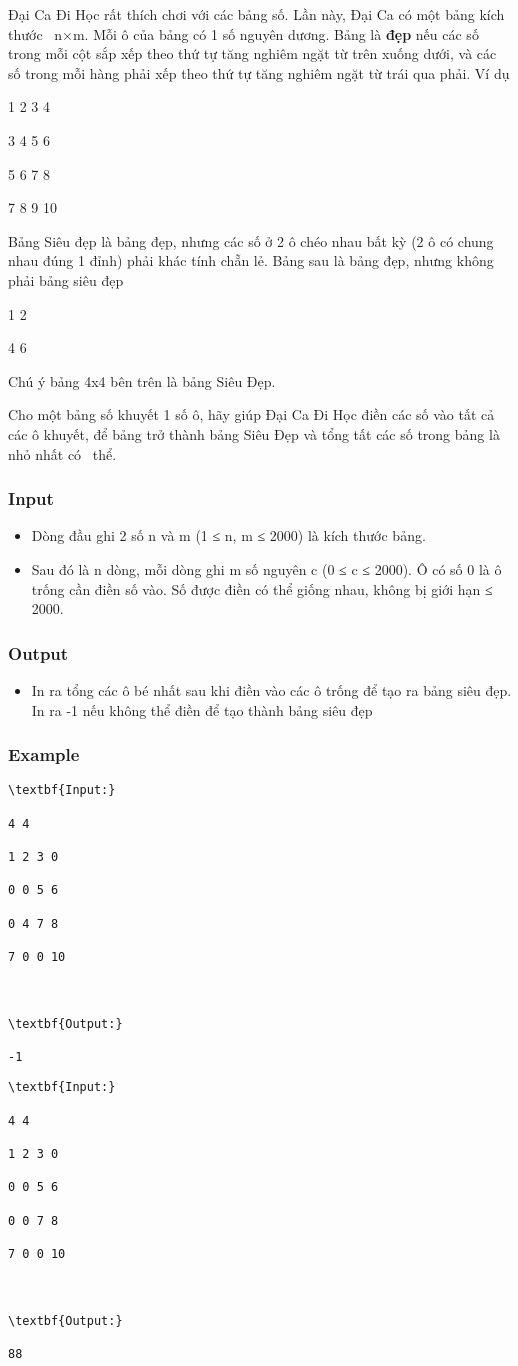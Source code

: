 

Đại Ca Đi Học rất thích chơi với các bảng số. Lần này, Đại Ca có một bảng kích thước  n×m. Mỗi ô của bảng có 1 số nguyên dương. Bảng là \textbf{đẹp }nếu các số trong mỗi cột sắp xếp theo thứ tự tăng nghiêm ngặt từ trên xuống dưới, và các số trong mỗi hàng phải xếp theo thứ tự tăng nghiêm ngặt từ trái qua phải. Ví dụ

1 2 3 4

3 4 5 6

5 6 7 8

7 8 9 10

Bảng Siêu đẹp là bảng đẹp, nhưng các số ở 2 ô chéo nhau bất kỳ (2 ô có chung nhau đúng 1 đỉnh) phải khác tính chẵn lẻ. Bảng sau là bảng đẹp, nhưng không phải bảng siêu đẹp

1 2

4 6

Chú ý bảng 4x4 bên trên là bảng Siêu Đẹp.

Cho một bảng số khuyết 1 số ô, hãy giúp Đại Ca Đi Học điền các số vào tất cả các ô khuyết, để bảng trở thành bảng Siêu Đẹp và tổng tất các số trong bảng là nhỏ nhất có  thể.

\subsubsection{Input}
\begin{itemize}
	\item Dòng đầu ghi 2 số n và m (1 ≤ n, m ≤ 2000) là kích thước bảng.
	\item Sau đó là n dòng, mỗi dòng ghi m số nguyên c (0 ≤ c ≤ 2000). Ô có số 0 là ô trống cần điền số vào. Số được điền có thể giống nhau, không bị giới hạn ≤ 2000.
\end{itemize}

\subsubsection{Output}
\begin{itemize}
	\item In ra tổng các ô bé nhất sau khi điền vào các ô trống để tạo ra bảng siêu đẹp. In ra -1 nếu không thể điền để tạo thành bảng siêu đẹp
\end{itemize}

\subsubsection{Example}
\begin{verbatim}
\textbf{Input:}

4 4

1 2 3 0

0 0 5 6

0 4 7 8

7 0 0 10



\textbf{Output:}

-1

\end{verbatim}
\begin{verbatim}
\textbf{Input:}

4 4

1 2 3 0

0 0 5 6

0 0 7 8

7 0 0 10



\textbf{Output:}

88

\end{verbatim}
